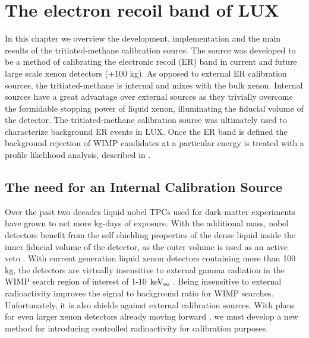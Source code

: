 \renewcommand{\thechapter}{7}

\chapter{The electron recoil band of LUX}
\label{Ch:T}

In this chapter we overview the development, implementation and the main results of the tritiated-methane calibration source. The source was developed to be a method of calibrating the electronic recoil (ER) band in current and future large scale xenon detectors (+100 kg). As opposed to external ER calibration sources, the tritiated-methane is internal and mixes with the bulk xenon. Internal sources have a great advantage over external sources as they trivially overcome the formidable stopping power of liquid xenon, illuminating the fiducial volume of the detector. The tritiated-methane calibration source was ultimately used to characterize background ER events in LUX. Once the ER band is defined the background rejection of WIMP candidates at a particular energy is treated with a profile likelihood analysis, described in \cite{LUX_PRL}.

\section{The need for an Internal Calibration Source} %

Over the past two decades liquid nobel TPCs used for dark-matter experiments have grown to net more kg-days of exposure. With the additional mass, nobel detectors benefit from the self shielding properties of the dense liquid inside the inner fiducial volume of the detector, as the outer volume is used as an active veto \cite{Aprile_LXe_overview}. With current generation liquid xenon detectors containing more than 100 kg, the detectors are virtually insensitive to external gamma radiation in the WIMP search region of interest of 1-10 $\rm keV_{ee}$ \cite{LUX_BG} \cite{Xenon100} \cite{PandaX} \cite{XMass}. Being insensitive to external radioactivity improves the signal to background ratio for WIMP searches. Unfortunately, it is also shields against external calibration sources. With plans for even larger xenon detectors already moving forward \cite{LZ} \cite{Xenon1T}, we must develop a new method for introducing controlled radioactivity for calibration purposes.

